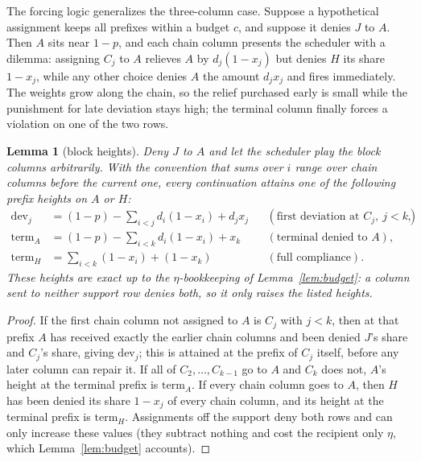 \documentclass[11pt]{article}
\newtheorem{lemma}[theorem]{Lemma}
\theoremstyle{definition}
\begin{document}
The forcing logic generalizes the three-column case.  Suppose a
hypothetical assignment keeps all prefixes within a budget $c$, and
suppose it denies $J$ to $A$.  Then $A$ sits near $1-p$, and each chain
column presents the scheduler with a dilemma: assigning $C_j$ to $A$
relieves $A$ by $d_j(1-x_j)$ but denies $H$ its share $1-x_j$, while any
other choice denies $A$ the amount $d_jx_j$ and fires immediately.  The
weights grow along the chain, so the relief purchased early is small
while the punishment for late deviation stays high; the terminal column
finally forces a violation on one of the two rows.

\begin{lemma}[block heights]\label{lem:heights}
Deny $J$ to $A$ and let the scheduler play the block columns arbitrarily.
With the convention that sums over $i$ range over chain columns before the
current one, every continuation attains one of the following prefix
heights on $A$ or $H$:
\begin{align*}
 \mathrm{dev}_j&=(1-p)-\textstyle\sum_{i<j}d_i(1-x_i)+d_jx_j
 &&(\text{first deviation at }C_j,\ j<k),\\
 \mathrm{term}_A&=(1-p)-\textstyle\sum_{i<k}d_i(1-x_i)+x_k
 &&(\text{terminal denied to }A),\\
 \mathrm{term}_H&=\textstyle\sum_{i<k}(1-x_i)+(1-x_k)
 &&(\text{full compliance}).
\end{align*}
These heights are exact up to the $\eta$-bookkeeping of
Lemma~\ref{lem:budget}: a column sent to neither support row denies both,
so it only raises the listed heights.
\end{lemma}

\begin{proof}
If the first chain column not assigned to $A$ is $C_j$ with $j<k$, then at
that prefix $A$ has received exactly the earlier chain columns and been
denied $J$'s share and $C_j$'s share, giving $\mathrm{dev}_j$; this is
attained at the prefix of $C_j$ itself, before any later
column can repair it.  If all of $C_2,\ldots,C_{k-1}$ go to $A$ and $C_k$
does not, $A$'s height at the terminal prefix is $\mathrm{term}_A$.  If
every chain column goes to $A$, then $H$ has been denied its share
$1-x_j$ of every chain column, and its height at the terminal prefix is
$\mathrm{term}_H$.  Assignments off the support deny both rows and can
only increase these values (they subtract nothing and cost the recipient
only $\eta$, which Lemma~\ref{lem:budget} accounts).
\end{proof}
\end{document}
